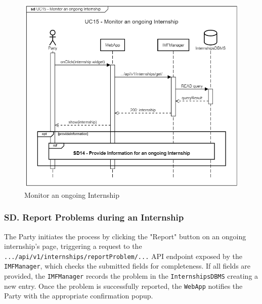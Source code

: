 \begin{figure}[H]
    \begin{center}
         \includegraphics[width=1\linewidth]{LaTeXCode/images/SequenceDiagrams/UC15-sequenceDiagram.png}
         \caption{Monitor an ongoing Internship}
         \label{fig:monitor_internship_sd}
     \end{center}
\end{figure}

\newpage

\subsubsection*{SD\cuc. Report Problems during an Internship}
\label{subsubsec:report_problems_sd}
The Party initiates the process by clicking the "Report" button on an ongoing internship's page, triggering a request to the \texttt{.../api/v1/internships/reportProblem/...} API endpoint exposed by the \texttt{IMFManager}, which checks the submitted fields for completeness. If all fields are provided, the \texttt{IMFManager} records the problem in the \texttt{InternshipsDBMS} creating a new entry. Once the problem is successfully reported, the \texttt{WebApp} notifies the Party with the appropriate confirmation popup.


